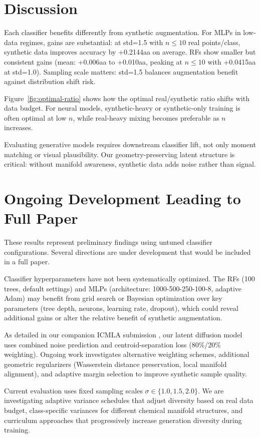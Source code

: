 \documentclass[conference]{IEEEtran}
\begin{document}
\section{Discussion}
Each classifier benefits differently from synthetic augmentation. For MLPs in low-data regimes, gains are substantial: at std=1.5 with $n \leq 10$ real points/class, synthetic data improves accuracy by +0.2144aa on average. RFs show smaller but consistent gains (mean: +0.006aa to +0.010aa, peaking at $n \leq 10$ with +0.0415aa at std=1.0). Sampling scale matters: std=1.5 balances augmentation benefit against distribution shift risk.

Figure~\ref{fig:optimal-ratio} shows how the optimal real/synthetic ratio shifts with data budget. For neural models, synthetic-heavy or synthetic-only training is often optimal at low $n$, while real-heavy mixing becomes preferable as $n$ increases.

Evaluating generative models requires downstream classifier lift, not only moment matching or visual plausibility. Our geometry-preserving latent structure is critical: without manifold awareness, synthetic data adds noise rather than signal.

\section{Ongoing Development Leading to Full Paper}
These results represent preliminary findings using untuned classifier configurations. Several directions are under development that would be included in a full paper.

Classifier hyperparameters have not been systematically optimized. The RFs (100 trees, default settings) and MLPs (architecture: 1000-500-250-100-8, adaptive Adam) may benefit from grid search or Bayesian optimization over key parameters (tree depth, neurons, learning rate, dropout), which could reveal additional gains or alter the relative benefit of synthetic augmentation.

As detailed in our companion ICMLA submission \cite{metzler2026}, our latent diffusion model uses combined noise prediction and centroid-separation loss (80\%/20\% weighting). Ongoing work investigates alternative weighting schemes, additional geometric regularizers (Wasserstein distance preservation, local manifold alignment), and adaptive margin selection to improve synthetic sample quality.

Current evaluation uses fixed sampling scales $\sigma \in \{1.0, 1.5, 2.0\}$. We are investigating adaptive variance schedules that adjust diversity based on real data budget, class-specific variances for different chemical manifold structures, and curriculum approaches that progressively increase generation diversity during training.
\end{document}
